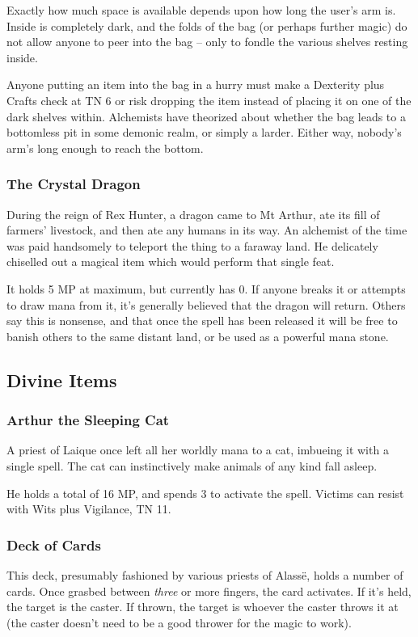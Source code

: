 Exactly how much space is available depends upon how long the user's arm is.  Inside is completely dark, and the folds of the bag (or perhaps further magic) do not allow anyone to peer into the bag -- only to fondle the various shelves resting inside.

Anyone putting an item into the bag in a hurry must make a Dexterity plus Crafts check at TN 6 or risk dropping the item instead of placing it on one of the dark shelves within.  Alchemists have theorized about whether the bag leads to a bottomless pit in some demonic realm, or simply a larder.  Either way, nobody's arm's long enough to reach the bottom.

\subsubsection{The Crystal Dragon}
During the reign of Rex Hunter, a dragon came to Mt Arthur, ate its fill of farmers' livestock, and then ate any humans in its way.  An alchemist of the time was paid handsomely to teleport the thing to a faraway land.  He delicately chiselled out a magical item which would perform that single feat.  

It holds 5 MP at maximum, but currently has 0.  If anyone breaks it or attempts to draw mana from it, it's generally believed that the dragon will return.  Others say this is nonsense, and that once the spell has been released it will be free to banish others to the same distant land, or be used as a powerful mana stone.

\subsection{Divine Items}

\subsubsection{Arthur the Sleeping Cat}
A priest of Laique once left all her worldly mana to a cat, imbueing it with a single spell.  The cat can instinctively make animals of any kind fall asleep.

He holds a total of 16 MP, and spends 3 to activate the spell.  Victims can resist with Wits plus Vigilance, TN 11.

\subsubsection{Deck of Cards}\label{deckofmanythings}
This deck, presumably fashioned by various priests of Alass\"{e}, holds a number of cards.  Once grasbed between \emph{three} or more fingers, the card activates.  If it's held, the target is the caster.  If thrown, the target is whoever the caster throws it at (the caster doesn't need to be a good thrower for the magic to work).

